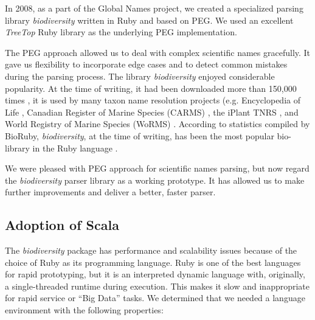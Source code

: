 \documentclass{bmcart}
\begin{document}
In 2008, as a part of the Global Names project, we created a specialized parsing library \textit{biodiversity} \cite{biodiversity} written in Ruby and based on PEG\@. We used an excellent \textit{TreeTop} Ruby library \cite{treetop} as the underlying PEG implementation.

The PEG approach allowed us to deal with complex scientific names gracefully.  It gave us flexibility to incorporate edge cases and to detect common mistakes during the parsing process. The library \textit{biodiversity} enjoyed considerable popularity. At the time of writing, it had been downloaded more than 150,000 times \cite{bdiv-downloads}, it is used by many taxon name resolution projects (e.g. Encyclopedia of Life \cite{eol}, Canadian Register of Marine Species (CARMS) \cite{carms}, the iPlant TNRS \cite{iplant}, and World Registry of Marine Species (WoRMS) \cite{worms}. According to statistics compiled by BioRuby, \textit{biodiversity}, at the time of writing, has been the most popular bio-library in the Ruby language \cite{biogems}.

We were pleased with PEG approach for scientific names parsing, but now regard the \textit{biodiversity} parser library as a working prototype. It has allowed us to make further improvements and deliver a better, faster parser.

\subsection*{Adoption of Scala}

The \textit{biodiversity} package has performance and scalability issues because of the choice of Ruby as its programming language. Ruby is one of the best languages for rapid prototyping, but it is an interpreted dynamic language with, originally, a single-threaded runtime during execution. This makes it slow and inappropriate for rapid service or ``Big Data'' tasks. We determined that we needed a language environment with the following properties:
\end{document}
